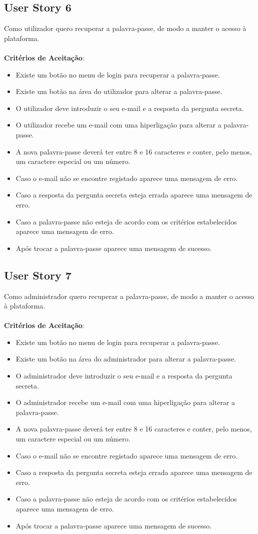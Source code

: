 \documentclass[a4paper,11pt]{article}
\begin{document}
\subsection*{User Story 6}
Como utilizador quero recuperar a palavra-passe, de modo a manter o acesso à plataforma.\\\\
\textbf{Critérios de Aceitação}:
\begin{itemize}
  \item Existe um botão no menu de login para recuperar a palavra-passe.
  \item Existe um botão na área do utilizador para alterar a palavra-passe.
  \item O utilizador deve introduzir o seu e-mail e a resposta da pergunta secreta.
  \item O utilizador recebe um e-mail com uma hiperligação para alterar a palavra-passe.
  \item A nova palavra-passe deverá ter entre 8 e 16 caracteres e conter, pelo menos, um caractere especial ou um número.
  \item Caso o e-mail não se encontre registado aparece uma mensagem de erro.
  \item Caso a resposta da pergunta secreta esteja errada aparece uma mensagem de erro.
  \item Caso a palavra-passe não esteja de acordo com os critérios estabelecidos aparece uma mensagem de erro.
  \item Após trocar a palavra-passe aparece uma mensagem de sucesso.
\end{itemize}

\subsection*{User Story 7}
Como administrador quero recuperar a palavra-passe, de modo a manter o acesso à plataforma.\\\\
\textbf{Critérios de Aceitação}:
\begin{itemize}
  \item Existe um botão no menu de login para recuperar a palavra-passe.
  \item Existe um botão na área do administrador para alterar a palavra-passe.
  \item O administrador deve introduzir o seu e-mail e a resposta da pergunta secreta.
  \item O administrador recebe um e-mail com uma hiperligação para alterar a palavra-passe.
  \item A nova palavra-passe deverá ter entre 8 e 16 caracteres e conter, pelo menos, um caractere especial ou um número.
  \item Caso o e-mail não se encontre registado aparece uma mensagem de erro.
  \item Caso a resposta da pergunta secreta esteja errada aparece uma mensagem de erro.
  \item Caso a palavra-passe não esteja de acordo com os critérios estabelecidos aparece uma mensagem de erro.
  \item Após trocar a palavra-passe aparece uma mensagem de sucesso.
\end{itemize}
\end{document}
